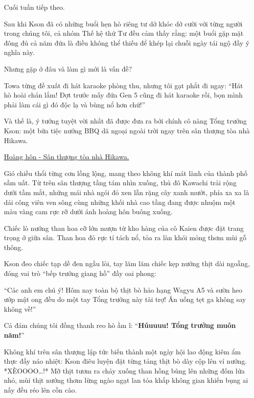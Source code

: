 \documentclass[../main.tex]{subfiles}
\begin{document}

Cuối tuần tiếp theo.

Sau khi Kson đã có những buổi hẹn hò riêng tư dở khóc dở cười với từng người trong chúng tôi, cả nhóm Thế hệ thứ Tư đều cảm thấy rằng: một buổi gặp mặt đông đủ cả năm đứa là điều không thể thiếu để khép lại chuỗi ngày tái ngộ đầy ý nghĩa này.

Nhưng gặp ở đâu và làm gì mới là vấn đề?

Towa từng đề xuất đi hát karaoke phòng thu, nhưng tôi gạt phắt đi ngay: ``Hát hò hoài chán lắm! Đợt trước mấy đứa Gen 5 cũng đi hát karaoke rồi, bọn mình phải làm cái gì đó độc lạ và bùng nổ hơn chứ!''

Và thế là, ý tưởng tuyệt vời nhất đã được đưa ra bởi chính cô nàng Tổng trưởng Kson: một bữa tiệc nướng BBQ dã ngoại ngoài trời ngay trên sân thượng tòa nhà Hikawa.

\ct

\begin{center}
  \uline{Hoàng hôn - Sân thượng tòa nhà Hikawa.}
\end{center}

Gió chiều thổi từng cơn lồng lộng, mang theo không khí mát lành của thành phố sầm uất. Từ trên sân thượng tầng tám nhìn xuống, thủ đô Kawachi trải rộng dưới tầm mắt, những mái nhà ngói đỏ xen lẫn rặng cây xanh mướt, phía xa xa là dải công viên ven sông cùng những khối nhà cao tầng đang được nhuộm một màu vàng cam rực rỡ dưới ánh hoàng hôn buông xuống.

Chiếc lò nướng than hoa cỡ lớn mượn từ kho hàng của cô Kaien được đặt trang trọng ở giữa sân. Than hoa đỏ rực tí tách nổ, tỏa ra làn khói mỏng thơm mùi gỗ thông.

Kson đeo chiếc tạp dề đen ngầu lòi, tay lăm lăm chiếc kẹp nướng thịt dài ngoẵng, đóng vai trò ``bếp trưởng giang hồ'' đầy oai phong:

``Các anh em chú ý! Hôm nay toàn bộ thịt bò hảo hạng Wagyu A5 và sườn heo ướp mật ong đều do một tay Tổng trưởng này tài trợ! Ăn uống tẹt ga không say không về!''

Cả đám chúng tôi đồng thanh reo hò ầm ĩ: ``\textbf{Húuuuu! Tổng trưởng muôn năm!}''

Không khí trên sân thượng lập tức biến thành một ngày hội lao động kiêm ẩm thực đầy náo nhiệt: Kson điêu luyện đặt từng tảng thịt bò dày cộp lên vỉ nướng. *XÈOOOO\dots!* Mỡ thịt tươm ra chảy xuống than hồng bùng lên những đốm lửa nhỏ, mùi thịt nướng thơm lừng ngào ngạt lan tỏa khắp không gian khiến bụng ai nấy đều réo lên cồn cào.
\end{document}
